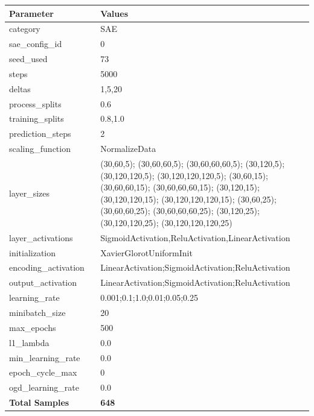 \documentclass[a4paper,11pt,oneside]{article}
\theoremstyle{plain}
\theoremstyle{definition}
\begin{document}
	\begin{longtable}[H]{|p{0.3\linewidth}|p{0.7\linewidth}|} \hline			\rowcolor{beaublue} \textbf{Parameter} &\textbf{Values} \\\hline{category} & {SAE} \\\hline
		{sae\_config\_id} & {0} \\\hline
		{seed\_used} & {73} \\\hline
		{steps} & {5000} \\\hline
		{deltas} & {1,5,20} \\\hline
		{process\_splits} & {0.6} \\\hline
		{training\_splits} & {0.8,1.0} \\\hline
		{prediction\_steps} & {2} \\\hline
		{scaling\_function} & {NormalizeData} \\\hline
		{layer\_sizes} & {(30,60,5); (30,60,60,5); (30,60,60,60,5); (30,120,5); (30,120,120,5); (30,120,120,120,5); (30,60,15); (30,60,60,15); (30,60,60,60,15); (30,120,15); (30,120,120,15); (30,120,120,120,15); (30,60,25); (30,60,60,25); (30,60,60,60,25); (30,120,25); (30,120,120,25); (30,120,120,120,25)} \\\hline
		{layer\_activations} & {SigmoidActivation,ReluActivation,LinearActivation} \\\hline
		{initialization} & {XavierGlorotUniformInit} \\\hline
		{encoding\_activation} & {LinearActivation;SigmoidActivation;ReluActivation} \\\hline
		{output\_activation} & {LinearActivation;SigmoidActivation;ReluActivation} \\\hline
		{learning\_rate} & {0.001;0.1;1.0;0.01;0.05;0.25} \\\hline
		{minibatch\_size} & {20} \\\hline
		{max\_epochs} & {500} \\\hline
		{l1\_lambda} & {0.0} \\\hline
		{min\_learning\_rate} & {0.0} \\\hline
		{epoch\_cycle\_max} & {0} \\\hline
		{ogd\_learning\_rate} & {0.0} \\\hline
		{\textbf{Total Samples}} & {\textbf{648}} \\\hline
	\end{longtable}
	
	\newpage
\end{document}
